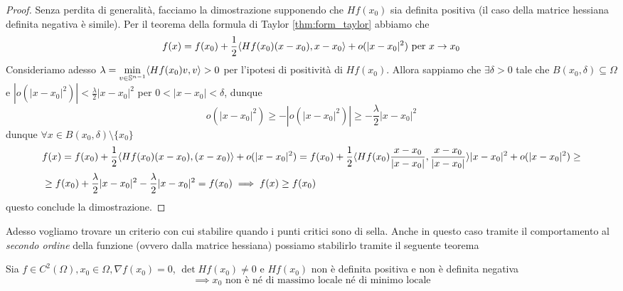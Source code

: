 \begin{proof} Senza perdita di generalità, facciamo la dimostrazione supponendo che $Hf(x_0)$ sia definita positiva (il caso della matrice hessiana definita negativa è simile). 
Per il teorema della formula di Taylor \ref{thm:form_taylor} abbiamo che
$$
f(x) = f(x_0) + \frac{1}{2} \langle Hf(x_0)(x-x_0), x-x_0 \rangle + o(|x-x_0|^2) \text{ per } x \to x_0
$$
Consideriamo adesso $\lambda = \min\limits_{v \in \mathbb{S}^{n-1}} \langle Hf(x_0)v, v \rangle > 0$ per l'ipotesi di positività di $Hf(x_0)$. Allora sappiamo che $\exists \delta > 0$ tale che $B(x_0, \delta) \subseteq \Omega$ e $|o(|x-x_0|^2)| < \frac{\lambda}{2}|x-x_0|^2$ per $0 < |x-x_0| < \delta$, dunque
$$
o(|x-x_0|^2) \geq -|o(|x-x_0|^2)| \geq -\frac{\lambda}{2}|x-x_0|^2
$$
dunque $\forall x \in B(x_0, \delta) \setminus \{ x_0 \}$
\begin{align*}
&f(x) = f(x_0) + \frac{1}{2}\langle Hf(x_0)(x-x_0), (x-x_0) \rangle + o(|x-x_0|^2) = f(x_0) + \frac{1}{2} \langle Hf(x_0)\frac{x-x_0}{|x-x_0|}, \frac{x-x_0}{|x-x_0|} \rangle|x-x_0|^2 + o(|x-x_0|^2) \geq \\
&\geq f(x_0) + \frac{\lambda}{2}|x-x_0|^2 - \frac{\lambda}{2}|x-x_0|^2 = f(x_0) \implies f(x) \geq f(x_0)
\end{align*}
questo conclude la dimostrazione.
\end{proof}
Adesso vogliamo trovare un criterio con cui stabilire quando i punti critici sono di sella. Anche in questo caso tramite il comportamento al \emph{secondo ordine} della funzione (ovvero dalla matrice hessiana) possiamo stabilirlo tramite il seguente teorema
\begin{theorem}
Sia $f \in C^2(\Omega), x_0 \in \Omega, \nabla f(x_0) = 0$, $\det{Hf(x_0)} \neq 0$ e $Hf(x_0)$ non è definita positiva e non è definita negativa
$$
\implies x_0 \text{ non è né di massimo locale né di minimo locale}
$$
\end{theorem}
